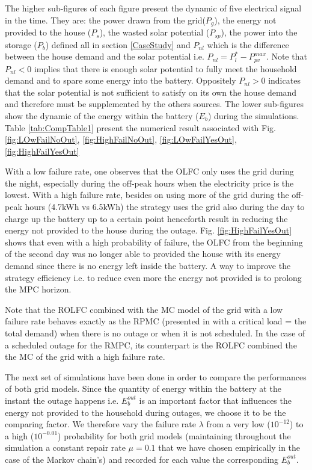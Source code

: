 \documentclass[conference]{IEEEtran}
\begin{document}
  The higher sub-figures of each figure present the dynamic of  five electrical signal in the time. They are: the power drawn from the grid($P_g$), the energy not provided to the house ($P_s$), the wasted solar potential ($P_{sp}$), the power into the storage ($P_b$) defined all in section \ref{CaseStudy} and $P_{nl}$ which is the difference between the house demand and the solar potential i.e. $P_{nl} = P_l^* - P_{pv}^{max}$. Note that $P_{nl} < 0$ implies that there is enough solar potential to fully meet the household demand and to spare some energy into the battery. Oppositely $P_{nl} > 0$  indicates that the solar potential is not sufficient to satisfy on its own the house demand and therefore must be supplemented by the others sources. The lower sub-figures show the dynamic of the energy within the battery ($E_b$) during the simulations. Table \ref{tab:CompTable1} present the numerical result associated with Fig. \ref{fig:LOwFailNoOut}, \ref{fig:HighFailNoOut}, \ref{fig:LOwFailYesOut}, \ref{fig:HighFailYesOut}
  
  With a low failure rate, one observes that the OLFC only uses the grid during the night, especially during the off-peak hours when the electricity price is the lowest. With a high failure rate, besides on using  more of the grid during the off-peak hours (4.7kWh vs 6.5kWh) the strategy uses the grid also during the day to charge up the battery up to a certain point henceforth result in reducing the energy not provided to the house during the outage. Fig. \ref{fig:HighFailYesOut} shows that even with a high probability of failure, the OLFC from the beginning of the second day was no longer able to provided the house with its energy demand since there is no energy left inside the battery. A way to improve the strategy efficiency i.e. to reduce even more the energy not provided is to prolong the MPC horizon.
  
  Note that the ROLFC combined with the MC model of the grid with a low failure rate behaves exactly as the RPMC (presented in \cite{JPrPHa2019} with a critical load = the total demand) when there is no outage or when it is not scheduled. In the case of a scheduled outage for the RMPC, its counterpart is the ROLFC combined the the MC of the grid with a high failure rate. 
  
  The next set of simulations have been done in order to compare the performances of both grid models. Since the quantity of energy within the battery at the instant the outage happens i.e. $E_b^{out}$ is an important factor that influences the energy not provided to the household during outages, we choose it to be the comparing factor. We therefore vary the failure rate $\lambda$ from a very low ($10^{-12}$) to a high ($10^{-0.01}$) probability for both grid models (maintaining throughout the simulation a constant repair rate $\mu=0.1$ that we have chosen empirically in the case of the Markov chain's) and recorded for each value the corresponding $E_b^{out}$.
  
\end{document}
